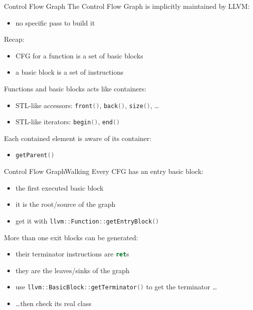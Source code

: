 \documentclass[10pt,mathserif]{beamer}
\newcommand{\cppinline}[1]{\lstinline[language=C++]!#1!}
\newcommand{\llvminline}[1]{\lstinline[language=LLVM]!#1!}
\begin{document}
\begin{frame}{Control Flow Graph}
The Control Flow Graph is implicitly maintained by LLVM:

\begin{itemize}
\item no specific pass to build it
\end{itemize}

\vfill
Recap:

\begin{itemize}
\item CFG for a function is a set of basic blocks
\item a basic block is a set of instructions
\end{itemize}

\vfill
Functions and basic blocks acts like containers:

\begin{itemize}
\item STL-like accessors: \cppinline{front()}, \cppinline{back()},
      \cppinline{size()}, \ldots
\item STL-like iterators: \cppinline{begin()}, \cppinline{end()}
\end{itemize}

\vfill
Each contained element is aware of its container:

\begin{itemize}
\item \cppinline{getParent()}
\end{itemize}
\end{frame}

\begin{frame}{Control Flow Graph}{Walking}
Every CFG has an entry basic block:

\begin{itemize}
\item the \alert{first} executed basic block
\item it is the \alert{root/source} of the graph
\item get it with \cppinline{llvm::Function::getEntryBlock()}
\end{itemize}

\vfill
More than one exit blocks can be generated:

\begin{itemize}
\item their terminator instructions are \llvminline{ret}s
\item they are the \alert{leaves/sinks} of the graph
\item use \cppinline{llvm::BasicBlock::getTerminator()} to get the terminator
      \ldots
\item \ldots then check its real class
\end{itemize}
\end{frame}
\end{document}
